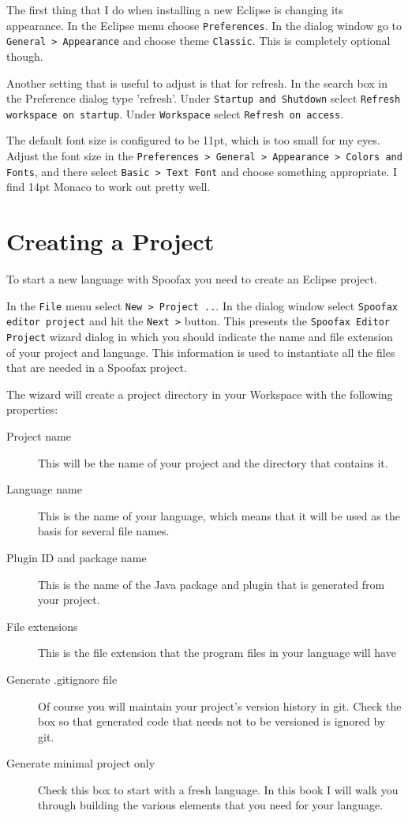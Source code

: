 The first thing that I do when installing a new Eclipse is changing its
appearance. In the Eclipse menu choose \texttt{Preferences}. In the dialog
window go to \texttt{General > Appearance} and choose theme \texttt{Classic}. 
This is completely optional though.

Another setting that is useful to adjust is that for refresh. In the search box
in the Preference dialog type 'refresh'. Under \texttt{Startup and Shutdown}
select \texttt{Refresh workspace on startup}. Under \texttt{Workspace} select
\texttt{Refresh on access}.

The default font size is configured to be 11pt, which is too small for my eyes. 
Adjust the font size in the \texttt{Preferences > General > Appearance > Colors
and Fonts}, and there select \texttt{Basic > Text Font} and choose something
appropriate. I find 14pt Monaco to work out pretty well.

\section{Creating a Project}

To start a new language with Spoofax you need to create an Eclipse project.

In the \texttt{File} menu select \texttt{New > Project ..}. In the dialog
window select \texttt{Spoofax editor project} and hit the \texttt{Next >}
button. This presents the \texttt{Spoofax Editor Project} wizard dialog in
which you should indicate the name and file extension of your project
and language. This information is used to instantiate all the files that are
needed in a Spoofax project.

The wizard will create a project directory in your Workspace with the following
properties:

\begin{description}
\item[Project name] This will be the name of your project and the directory that
contains it.
\item[Language name] This is the name of your language, which means that it will
be used as the basis for several file names.
\item[Plugin ID and package name] This is the name of the Java
package and plugin that is generated from your project.
\item[File extensions] This is the file extension that the program files in
your language will have 
\item[Generate .gitignore file] Of course you will maintain your project's
version history in git. Check the box so that generated code that needs not to
be versioned is ignored by git.
\item[Generate minimal project only] Check this box to start with a fresh
language. In this book I will walk you through building the various elements
that you need for your language.
\end{description}

